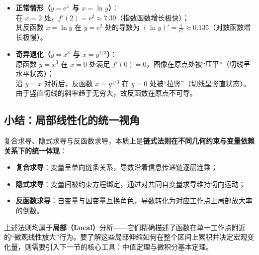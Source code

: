 \begin{itemize}\tightlist
  \item \textbf{正常情形（\(y=\mathrm{e}^{x}\) 与 \(x=\ln y\)）}：\\
  在 \(x=2\) 处，\(f'(2)=\mathrm{e}^{2} \approx 7.39\)（指数函数增长极快）；\\
  其反函数 \(x=\ln y\) 在 \(y=\mathrm{e}^{2}\) 处的导数为 \((\ln y)' = \frac{1}{\mathrm{e}^{2}} \approx 0.135\)（对数函数增长极慢）。

  \item \textbf{奇异退化（\(y=x^3\) 与 \(x=y^{1/3}\)）}：\\
  原函数 \(y=x^3\) 在 \(x=0\) 处满足 \(f'(0)=0\)，图像在原点处被``压平''（切线呈水平状态）；\\
  沿 \(y=x\) 对折后，反函数 \(x=y^{1/3}\) 在 \(y=0\) 处被``拉竖''（切线呈竖直状态）。由于竖直切线的斜率趋于无穷大，故反函数在原点不可导。
\end{itemize}

\subsection{小结：局部线性化的统一视角}

复合求导、隐式求导与反函数求导，本质上是\textbf{链式法则在不同几何约束与变量依赖关系下的统一体现}：
\begin{itemize}\tightlist
  \item \textbf{复合求导}：变量呈单向链条关系，导数沿着信息传递链逐层连乘；
  \item \textbf{隐式求导}：变量间被约束方程绑定，通过对共同自变量求导维持切向运动；
  \item \textbf{反函数求导}：自变量与因变量互换角色，导数转化为对应工作点上局部放大率的倒数。
\end{itemize}

上述法则均属于\textbf{局部（Local）}分析——它们精确描述了函数在单一工作点附近的“微观线性放大”行为。要了解这些局部伸缩如何在整个区间上累积并决定宏观变化量，则需要引入下一节的核心工具：中值定理与微积分基本定理。